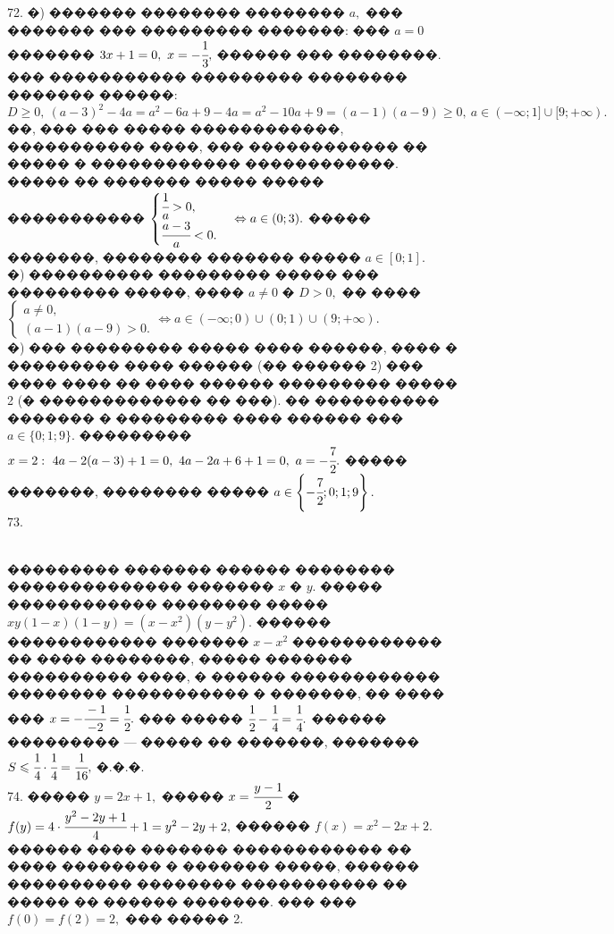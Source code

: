\documentclass[12pt]{article}
\begin{document}
72. �) ������� �������� �������� $a,$ ��� ������� ��� ��������� �������: ��� $a=0$ ������� $3x+1=0,\ x=-\cfrac{1}{3},$ ������ ��� ��������. ��� ����������� ��������� �������� ������� ������: $D\geqslant0,\ (a-3)^2-4a=a^2-6a+9-4a=a^2-10a+9=(a-1)(a-9)\geqslant0,\ a\in(-\infty;1]\cup[9;+\infty).$ ��, ��� ��� ����� ������������, ����������� ����, ��� ������������ �� ����� � ������������ ������������. ����� �� ������� ����� ����� ����������� $\begin{cases} \cfrac{1}{a}>0,\\ \cfrac{a-3}{a}<0.\end{cases} \Leftrightarrow a\in (0;3).$ ����� �������, �������� ������� ����� $a\in[0;1].$\\
�) ���������� ��������� ����� ��� ��������� �����, ���� $a\neq0$ � $D>0,$ �� ���� \\$\begin{cases}a\neq0,\\ (a-1)(a-9)>0.\end{cases}\Leftrightarrow a\in(-\infty;0)\cup(0;1)\cup(9;+\infty).$\\
�) ��� ��������� ����� ���� ������, ���� � ��������� ���� ������ (�� ������ 2) ��� ���� ���� �� ���� ������ ��������� ����� 2 (� ������������� �� ���). �� ���������� ������� � ��������� ���� ������ ��� $a\in\{0; 1; 9\}.$ ��������� $x=2:\ 4a-2(a-3)+1=0,\ 4a-2a+6+1=0,\ a=-\cfrac{7}{2}.$ ����� �������, �������� ����� $a\in \left\{-\cfrac{7}{2};0; 1; 9\right\}.$\\
73. \begin{figure}[ht!]
\end{figure}\\
��������� ������� ������ �������� �������������� ������� $x$ � $y.$ ����� ������������ �������� ����� $xy(1-x)(1-y)=(x-x^2)(y-y^2).$ ������ ������������ ������� $x-x^2$ ������������ �� ���� ��������, ����� ������� ���������� ����, � ������ ������������ �������� ����������� � �������, �� ���� ��� $x=-\cfrac{-1}{-2}=\cfrac{1}{2}.$ ��� ����� $\cfrac{1}{2}-\cfrac{1}{4}=\cfrac{1}{4}.$ ������ ��������� --- ����� �� �������, ������� $S\leqslant \cfrac{1}{4}\cdot \cfrac{1}{4}=\cfrac{1}{16},$ �.�.�.\\
74. ����� $y=2x+1,$ ����� $x=\cfrac{y-1}{2}$ � $f(y)=4\cdot\cfrac{y^2-2y+1}{4}+1=y^2-2y+2,$ ������ $f(x)=x^2-2x+2.$ ������ ���� ������� ������������ �� ���� �������� � ������� �����, ������ ���������� �������� ����������� �� ����� �� ������ �������. ��� ��� $f(0)=f(2)=2,$ ��� ����� 2.\\
\end{document}
